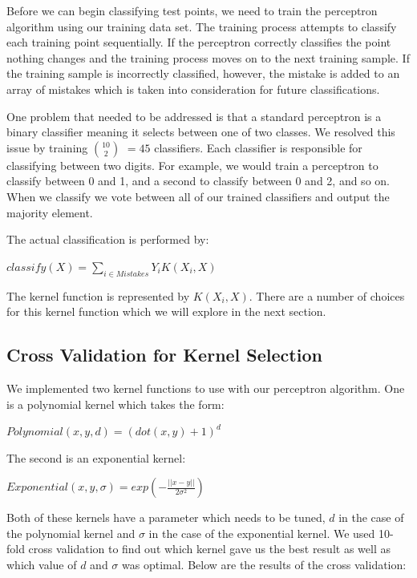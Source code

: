 \documentclass{article} %
\begin{document}
Before we can begin classifying test points, we need to train the perceptron
algorithm using our training data set. The training process attempts
to classify each training point sequentially. If the perceptron correctly
classifies the point nothing changes and the training process moves on to the
next training sample. If the training sample is incorrectly classified, however,
the mistake is added to an array of mistakes which is taken into consideration
for future classifications.

One problem that needed to be addressed is that a standard perceptron is a binary
classifier meaning it selects between one of two classes. We resolved this issue
by training $10 \choose 2$ $=45$ classifiers. Each classifier is responsible for
classifying between two digits. For example, we would train a perceptron to
classify between 0 and 1, and a second to classify between 0 and 2, and so
on. When we classify we vote between all of our trained classifiers and output
the majority element.

The actual classification is performed by:

\begin{center}
$classify(X) = \sum\limits_{i \in Mistakes}{Y_iK(X_i, X)}$
\end{center}

The kernel function is represented by $K(X_i, X)$. There are a number of choices
for this kernel function which we will explore in the next section.

\subsection{Cross Validation for Kernel Selection}

We implemented two kernel functions to use with our perceptron algorithm. One is
a polynomial kernel which takes the form:

\begin{center}
$Polynomial(x, y, d) = (dot(x, y) + 1)^d$
\end{center}

The second is an exponential kernel:

\begin{center}
$Exponential(x, y, \sigma) = exp(-\frac{||x - y||}{2\sigma^2})$
\end{center}

Both of these kernels have a parameter which needs to be tuned, $d$ in the case of
the polynomial kernel and $\sigma$ in the case of the exponential kernel. We
used 10-fold cross validation to find out which kernel gave us the best result as well
as which value of $d$ and $\sigma$ was optimal. Below are the results of the cross
validation:
\end{document}
